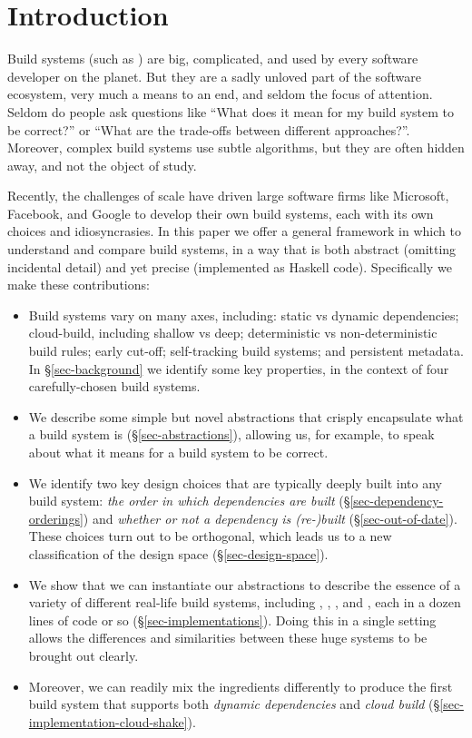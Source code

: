 \section{Introduction}\label{sec-intro}

Build systems (such as \Make) are big, complicated, and used by every
software developer on the planet.  But they are a sadly unloved part
of the software ecosystem, very much a means to an end, and seldom the
focus of attention.
Seldom do people ask questions like ``What does it mean for my build
system to be correct?'' or ``What are the trade-offs between different
approaches?''.  Moreover, complex build systems use subtle algorithms, but they
are often hidden away, and not the object of study.

Recently, the challenges of scale have driven large software firms
like Microsoft, Facebook, and Google to develop their own build
systems, each with its own choices and idiosyncrasies.
In this paper we offer a general framework in which to understand
and compare build systems,
in a way that is both abstract (omitting incidental detail)
and yet precise (implemented as Haskell code).  Specifically we make
these contributions:
\begin{itemize}
\item Build systems vary on many axes,
including: static vs dynamic dependencies; cloud-build, including
shallow vs deep; deterministic vs non-deterministic build rules;
early cut-off; self-tracking build systems; and persistent metadata.
In \S\ref{sec-background} we identify some key properties, in the context of
four carefully-chosen build systems.
\item We describe some simple but novel abstractions that
  crisply encapsulate what a build system is (\S\ref{sec-abstractions}),
  allowing us, for example, to speak about what it means for a build system to be correct.

\item We identify two key design choices
  that are typically deeply built into any build system:
  \emph{the order in which dependencies are built} (\S\ref{sec-dependency-orderings})
  and \emph{whether or not a dependency is (re-)built} (\S\ref{sec-out-of-date}).
  These choices turn out to be orthogonal, which leads us to a new
  classification of the design space (\S\ref{sec-design-space}).

\item We show that we can instantiate
our abstractions to describe the essence of a variety of different
real-life build systems, including \Make, \Shake, \Bazel, and \Excel, each in
a dozen lines of code or so (\S\ref{sec-implementations}).
Doing this in a single setting allows
the differences and similarities between these huge systems to be
brought out clearly.

\item Moreover, we can readily mix the ingredients differently to produce the first
  build system that supports both \emph{dynamic dependencies}
  and \emph{cloud build} (\S\ref{sec-implementation-cloud-shake}).

\end{itemize}
